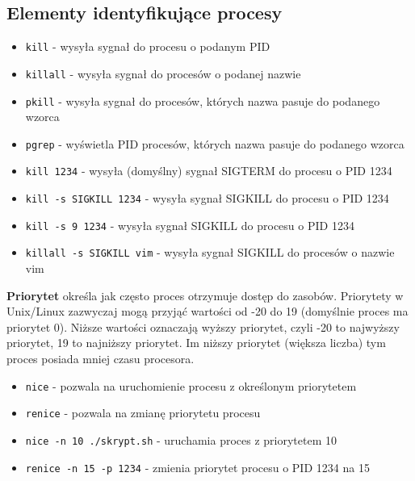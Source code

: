 \documentclass{article}
\begin{document}
\newpage \subsection{Elementy identyfikujące procesy}
\begin{itemize}
    \item\texttt{kill} - wysyła sygnał do procesu o podanym PID
    \item\texttt{killall} - wysyła sygnał do procesów o podanej nazwie 
    \item\texttt{pkill} - wysyła sygnał do procesów, których nazwa pasuje do podanego wzorca
    \item\texttt{pgrep} - wyświetla PID procesów, których nazwa pasuje do podanego wzorca
    \item\texttt{kill 1234} - wysyła (domyślny) sygnał SIGTERM do procesu o PID 1234
    \item\texttt{kill -s SIGKILL 1234} - wysyła sygnał SIGKILL do procesu o PID 1234
    \item \texttt{kill -s 9 1234} - wysyła sygnał SIGKILL do procesu o PID 1234
    \item\texttt{killall -s SIGKILL vim} - wysyła sygnał SIGKILL do procesów o nazwie vim
\end{itemize}

\textbf{Priorytet} określa jak często proces otrzymuje dostęp do zasobów. Priorytety w Unix/Linux zazwyczaj mogą przyjąć wartości od -20 do 19 (domyślnie proces ma priorytet 0). Niższe wartości oznaczają wyższy priorytet, czyli -20 to najwyższy priorytet, 19 to najniższy priorytet. Im niższy priorytet (większa liczba) tym proces posiada mniej czasu procesora.
\begin{itemize}
    \item\texttt{nice} -  pozwala na uruchomienie procesu z określonym priorytetem
    \item \texttt{renice} - pozwala na zmianę priorytetu procesu
    \item \texttt{nice -n 10 ./skrypt.sh} - uruchamia proces z priorytetem 10
    \item \texttt{renice -n 15 -p 1234} - zmienia priorytet procesu o PID 1234 na 15
\end{itemize}
\end{document}
